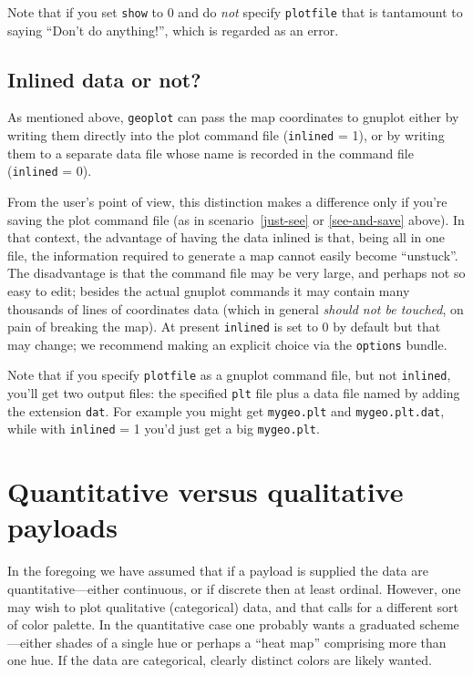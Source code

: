 \documentclass{article}
\begin{document}
Note that if you set \texttt{show} to 0 and do \textit{not} specify
\texttt{plotfile} that is tantamount to saying ``Don't do anything!'',
which is regarded as an error.

\subsection{Inlined data or not?}

As mentioned above, \texttt{geoplot} can pass the map coordinates to
\textsf{gnuplot} either by writing them directly into the plot command
file (\texttt{inlined} = 1), or by writing them to a separate data
file whose name is recorded in the command file (\texttt{inlined} =
0).

From the user's point of view, this distinction makes a difference
only if you're saving the plot command file (as in
scenario~\ref{just-see} or \ref{see-and-save} above).  In that
context, the advantage of having the data inlined is that, being all
in one file, the information required to generate a map cannot easily
become ``unstuck''. The disadvantage is that the command file may be
very large, and perhaps not so easy to edit; besides the actual
\textsf{gnuplot} commands it may contain many thousands of lines of
coordinates data (which in general \textit{should not be touched}, on
pain of breaking the map). At present \texttt{inlined} is set to
0 by default but that may change; we recommend making an explicit
choice via the \texttt{options} bundle.

Note that if you specify \texttt{plotfile} as a \textsf{gnuplot}
command file, but not \texttt{inlined}, you'll get two output files:
the specified \texttt{plt} file plus a data file named by adding the
extension \texttt{dat}. For example you might get \texttt{mygeo.plt}
and \texttt{mygeo.plt.dat}, while with \texttt{inlined} = 1 you'd just
get a big \texttt{mygeo.plt}.

\section{Quantitative versus qualitative payloads}
\label{sec:qualitative}

In the foregoing we have assumed that if a payload is supplied the
data are quantitative---either continuous, or if discrete then at
least ordinal. However, one may wish to plot qualitative (categorical)
data, and that calls for a different sort of color palette.  In the
quantitative case one probably wants a graduated scheme---either
shades of a single hue or perhaps a ``heat map'' comprising more than
one hue. If the data are categorical, clearly distinct colors are
likely wanted.
\end{document}
